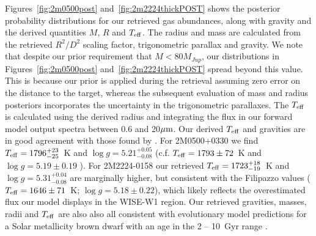 \documentclass[useAMS,usenatbib]{mn2e}
\begin{document}
Figures~\ref{fig:2m0500post} and~\ref{fig:2m2224thickPOST} shows the posterior probability distributions for our retrieved gas abundances, along with gravity and the derived quantities $M$, $R$ and $T_{\rm eff}$. The radius and mass are calculated from the retrieved $R^2/D^2$ scaling factor, trigonometric parallax and gravity. We note that despite our prior requirement that $M < 80 M_{Jup}$, our distributions in Figures~\ref{fig:2m0500post} and~\ref{fig:2m2224thickPOST} spread beyond this value. This is because our prior is applied during the retrieval assuming zero error on the distance to the target, whereas the subsequent evaluation of mass and radius posteriors incorporates the uncertainty in the trigonometric parallaxes. 
The $T_{\rm eff}$ is calculated using the derived radius and integrating the flux in our forward model output spectra between 0.6 and 20$\hbox{$\mu$m}$. Our derived $T_{\rm eff}$ and gravities are in good agreement with those found by \citet{filippazzo2015}. For 2M0500+0330 we find $T_{\rm eff} = 1796^{+23}_{-25}$~K and $\log g  = 5.21^{+0.05}_{-0.08}$  (c.f. $T_{\rm eff} = 1793 \pm 72$~K and $\log g = 5.19 \pm 0.19$ ). For 2M2224-0158 our retrieved $T_{\rm eff} = 1723^{+18}_{-19}$~K and $\log g = 5.31^{+0.04}_{-0.08}$ are marginally higher, but consistent with the  Filipazzo values ( $T_{\rm eff} = 1646 \pm 71$~K; $\log g = 5.18 \pm 0.22$), which likely reflects the overestimated flux our model displays in the WISE-W1 region.  Our retrieved gravities, masses, radii and $T_{\rm eff}$ are also also all consistent with evolutionary model predictions for a Solar metallicity brown dwarf with an age in the 2 -- 10~Gyr range \citep{sm08,baraffe03,chabrier2000,baraffe2002}. 
\end{document}
